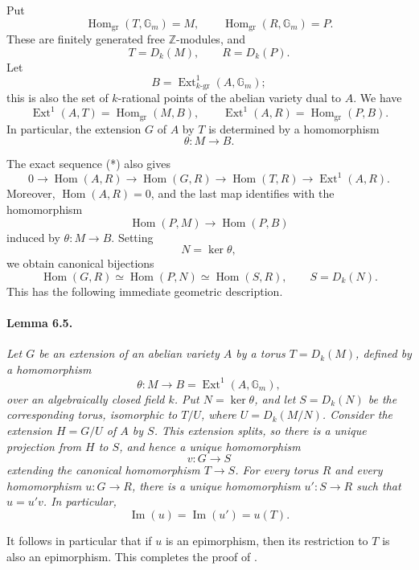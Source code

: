 Put
\[
  \operatorname{Hom}_{\mathrm{gr}}(T,\mathbb G_m)=M,
  \qquad
  \operatorname{Hom}_{\mathrm{gr}}(R,\mathbb G_m)=P.
\]
These are finitely generated free \(\mathbb Z\)-modules, and
\[
  T=D_k(M),\qquad R=D_k(P).
\]
Let
\[
  B=\operatorname{Ext}^{1}_{k\text{-gr}}(A,\mathbb G_m);
\]
this is also the set of \(k\)-rational points of the abelian variety
dual to \(A\). We have
\[
  \operatorname{Ext}^{1}(A,T)
    =\operatorname{Hom}_{\mathrm{gr}}(M,B),
  \qquad
  \operatorname{Ext}^{1}(A,R)
    =\operatorname{Hom}_{\mathrm{gr}}(P,B). \tag{**}\label{sga3:xii:lemma:6-4:equation:double-star}
\]
In particular, the extension \(G\) of \(A\) by \(T\) is determined
by a homomorphism
\[
  \theta:M\longrightarrow B.
\]

The exact sequence \textup{(*)} also gives
\[
  0\longrightarrow \operatorname{Hom}(A,R)
  \longrightarrow \operatorname{Hom}(G,R)
  \longrightarrow \operatorname{Hom}(T,R)
  \longrightarrow \operatorname{Ext}^{1}(A,R).
\]
Moreover, \(\operatorname{Hom}(A,R)=0\), and the last map identifies
with the homomorphism
\[
  \operatorname{Hom}(P,M)\longrightarrow
  \operatorname{Hom}(P,B)
\]
induced by \(\theta:M\to B\). Setting
\[
  N=\ker\theta,
\]
we obtain canonical bijections
\[
  \operatorname{Hom}(G,R)
  \simeq \operatorname{Hom}(P,N)
  \simeq \operatorname{Hom}(S,R),
  \qquad S=D_k(N).
\]
This has the following immediate geometric description.

\paragraph{\textbf{Lemma 6.5.}}
\emph{Let \(G\) be an extension of an abelian variety \(A\) by a
torus \(T=D_k(M)\), defined by a homomorphism
\[
  \theta:M\longrightarrow
  B=\operatorname{Ext}^{1}(A,\mathbb G_m),
\]
over an algebraically closed field \(k\). Put \(N=\ker\theta\), and
let \(S=D_k(N)\) be the corresponding torus, isomorphic to \(T/U\),
where \(U=D_k(M/N)\). Consider the extension \(H=G/U\) of \(A\) by
\(S\). This extension splits, so there is a unique projection from \(H\) to \(S\), and
hence a unique homomorphism
\[
  v:G\longrightarrow S
\]
extending the canonical homomorphism \(T\to S\). For every torus
\(R\) and every homomorphism \(u:G\to R\), there is a unique
homomorphism \(u':S\to R\) such that \(u=u'v\). In particular,
\[
  \operatorname{Im}(u)=\operatorname{Im}(u')=u(T).
\]}

It follows in particular that if \(u\) is an epimorphism, then its
restriction to \(T\) is also an epimorphism. This completes the
proof of .

